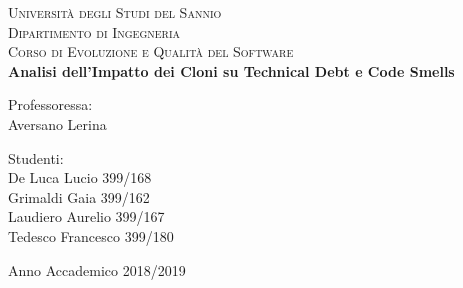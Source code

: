


\begin{titlepage}
\begin{adjustwidth}{-5em}{}
 \begin{center}
	\vspace{4em}
      {\Large \textsc{Università degli Studi del Sannio}}\\
      \vspace{1em}
      {\Large \textsc{Dipartimento di Ingegneria}}\\
      \vspace{1em}
      {\large \textsc{Corso di Evoluzione e Qualità del Software}}\\
      \vspace{5em}
      {\normalsize \textbf{Analisi dell'Impatto dei Cloni su Technical Debt e Code Smells}\\
      	\vspace{1em}
      }%
    \end{center}

\vskip 2.5cm
\begin{center}
	\begin{minipage}[t]{0.5\textwidth}
		\begin{flushleft}
			\large Professoressa:\vspace*{0.2cm} \\
			Aversano Lerina
		\end{flushleft}
	\end{minipage}%
	\begin{minipage}[t]{0.5\textwidth}
		\begin{flushright}
			\large Studenti:\vspace*{0.2cm} \\
			De Luca Lucio 399/168\\
			Grimaldi Gaia 399/162\\
			Laudiero Aurelio 399/167\\
			Tedesco Francesco 399/180\\
		\end{flushright}
	\end{minipage}
\end{center}
\end{adjustwidth}


\vspace*{1.5cm}
\begin{center}
\begin{minipage}[t]{0.5\textwidth}
	{\normalsize Anno Accademico 2018/2019}
\end{minipage}
\end{center}
\end{titlepage}